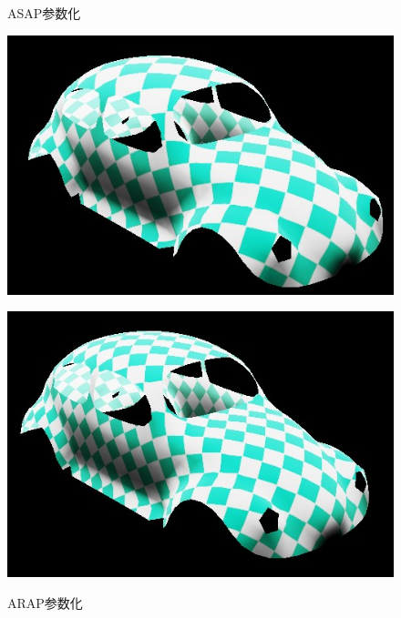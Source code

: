 \documentclass{article}
\begin{document}
	\begin{figure}[htbp]
		\centering
		\begin{minipage}{0.49\linewidth}
			\centering
			\caption{ASAP参数化}
			\includegraphics[width=0.7\linewidth]{beetle_asap_tex.JPG}
			\label{chutian2}%
		\end{minipage}
		\begin{minipage}{0.49\linewidth}
			\centering
			\caption{ARAP参数化}
			\includegraphics[width=0.7\linewidth]{beetle_arap_tex.JPG}
			\label{chutian2}%
		\end{minipage}
	\end{figure}
	\clearpage
\end{document}
